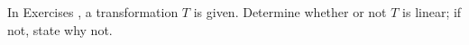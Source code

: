 {\noin In Exercises}
{, a transformation $T$ is given. Determine whether or not $T$ is linear; if not, state why not.}
